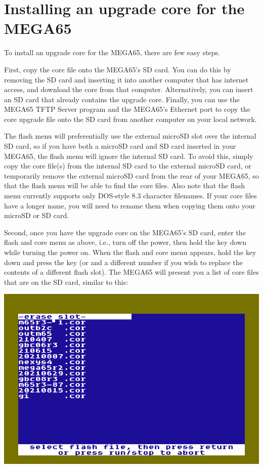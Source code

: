\section{Installing an upgrade core for the MEGA65}

To install an upgrade core for the MEGA65, there are few easy steps.

First, copy the core file onto the MEGA65's SD card.  You can do this by removing the SD card and inserting
it into another computer that has internet access, and download the core from that computer. Alternatively,
you can insert an SD card that already contains the upgrade core. Finally, you can use the MEGA65 TFTP Server
program and the MEGA65's Ethernet port to copy the core upgrade file onto the SD card from another computer
on your local network.

The flash menu will preferentially use the external microSD slot over
the internal SD card, so if you have both a microSD card and SD card
inserted in your MEGA65, the flash menu will ignore the
internal SD card. To avoid this, simply copy the core file(s) from the internal SD
card to the external microSD card, or temporarily remove the external
microSD card from the rear of your MEGA65, so that the flash menu will
be able to find the core files.  Also note that the flash menu
currently supports only DOS-style 8.3 character filenames. If your
core files have a longer name, you will need to rename them when
copying them onto your microSD or SD card.

Second, once you have the upgrade core on the MEGA65's SD card, enter the flash and core menu as above,
i.e., turn off the power, then hold the  key down while turning the power on.  When the flash
and core menu appears, hold the  key down and press the
 key (or  and a different number if you wish to replace the
contents of a different flash slot).  The MEGA65
will present you a list of core files that are on the SD card, similar
to this:

\includegraphics[width=\linewidth]{images/ss-flashmenu-selectcore.png}

